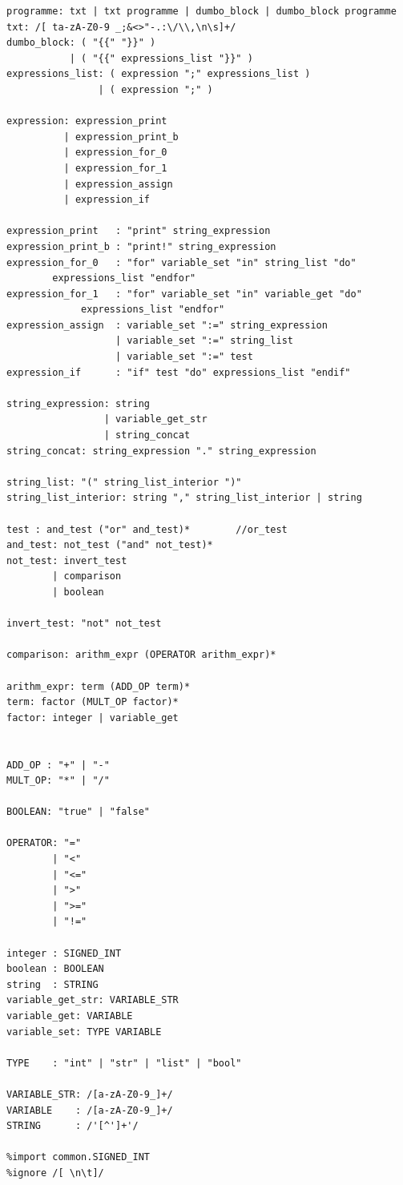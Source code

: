 \documentclass[a4paper, 12pt]{article}
\begin{document}
\begin{lstlisting}
programme: txt | txt programme | dumbo_block | dumbo_block programme
txt: /[ ta-zA-Z0-9 _;&<>"-.:\/\\,\n\s]+/
dumbo_block: ( "{{" "}}" )
           | ( "{{" expressions_list "}}" )
expressions_list: ( expression ";" expressions_list )
                | ( expression ";" )

expression: expression_print
          | expression_print_b
          | expression_for_0
          | expression_for_1
          | expression_assign
          | expression_if

expression_print   : "print" string_expression
expression_print_b : "print!" string_expression
expression_for_0   : "for" variable_set "in" string_list "do" 
		expressions_list "endfor"
expression_for_1   : "for" variable_set "in" variable_get "do" 
		     expressions_list "endfor"
expression_assign  : variable_set ":=" string_expression
                   | variable_set ":=" string_list
                   | variable_set ":=" test
expression_if      : "if" test "do" expressions_list "endif"

string_expression: string
                 | variable_get_str
                 | string_concat
string_concat: string_expression "." string_expression

string_list: "(" string_list_interior ")"
string_list_interior: string "," string_list_interior | string

test : and_test ("or" and_test)*        //or_test
and_test: not_test ("and" not_test)*
not_test: invert_test
        | comparison
        | boolean

invert_test: "not" not_test

comparison: arithm_expr (OPERATOR arithm_expr)*

arithm_expr: term (ADD_OP term)*
term: factor (MULT_OP factor)*
factor: integer | variable_get


ADD_OP : "+" | "-"
MULT_OP: "*" | "/"

BOOLEAN: "true" | "false"

OPERATOR: "="
        | "<"
        | "<="
        | ">"
        | ">="
        | "!="

integer : SIGNED_INT
boolean : BOOLEAN
string  : STRING
variable_get_str: VARIABLE_STR
variable_get: VARIABLE         
variable_set: TYPE VARIABLE     

TYPE    : "int" | "str" | "list" | "bool"

VARIABLE_STR: /[a-zA-Z0-9_]+/
VARIABLE    : /[a-zA-Z0-9_]+/
STRING      : /'[^']+'/

%import common.SIGNED_INT
%ignore /[ \n\t]/
\end{lstlisting}
\end{document}

